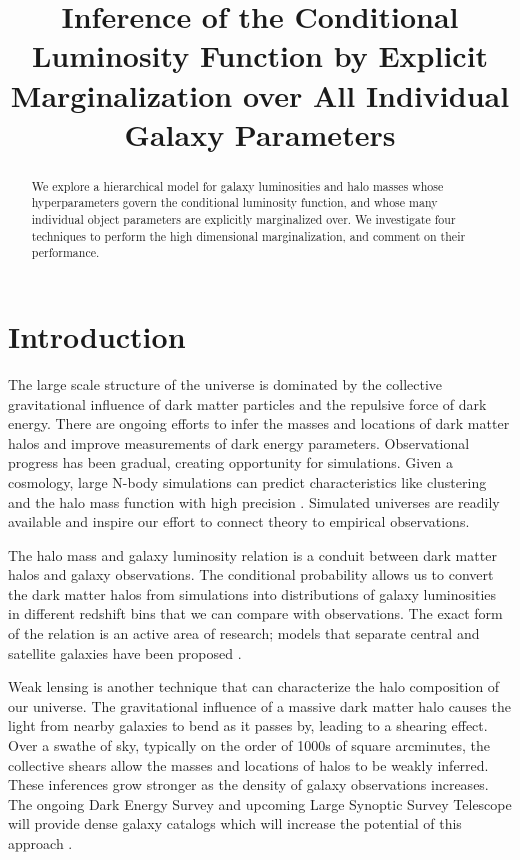 \documentclass[\docopts]{\docclass}
\begin{document}
\title{ Inference of the Conditional Luminosity Function by Explicit Marginalization over All Individual Galaxy Parameters }

\maketitlepre

\begin{abstract}

We explore a hierarchical model for galaxy luminosities and halo masses whose hyperparameters govern the conditional luminosity function, and whose many individual object parameters are explicitly marginalized over. 
We investigate four techniques to perform the high dimensional marginalization, and comment on their performance. 

\end{abstract}


\maketitlepost

%

\section{Introduction}
\label{sec:intro}

The large scale structure of the universe is dominated by the collective gravitational influence of dark matter particles and the repulsive force of dark energy.
There are ongoing efforts to infer the masses and locations of dark matter halos and improve measurements of dark energy parameters.
Observational progress has been gradual, creating opportunity for simulations.
Given a cosmology, large N-body simulations can predict characteristics like clustering and the halo mass function with high precision \citep*[eg.][]{nbody}.
Simulated universes are readily available and inspire our effort to connect theory to empirical observations.

The halo mass and galaxy luminosity relation is a conduit between dark matter halos and galaxy observations. 
The conditional probability allows us to convert the dark matter halos from simulations into distributions of galaxy luminosities in different redshift bins that we can compare with observations.
The exact form of the relation is an active area of research; models that separate central and satellite galaxies have been proposed \citep[eg.][]{satellites}.

Weak lensing is another technique that can characterize the halo composition of our universe. 
The gravitational influence of a massive dark matter halo causes the light from nearby galaxies to bend as it passes by, leading to a shearing effect. 
Over a swathe of sky, typically on the order of 1000s of square arcminutes, the collective shears allow the masses and locations of halos to be weakly inferred. 
These inferences grow stronger as the density of galaxy observations increases.
The ongoing Dark Energy Survey and upcoming Large Synoptic Survey Telescope will provide dense galaxy catalogs which will increase the potential of this approach \citep{des, lsst}. 
\end{document}
